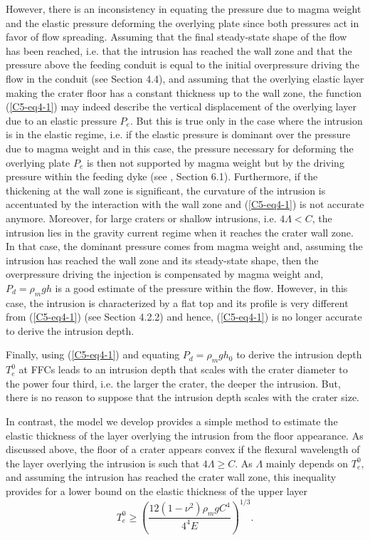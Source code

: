 However, there  is an  inconsistency in equating  the pressure  due to
magma weight  and the elastic  pressure deforming the  overlying plate
since both pressures act in favor of flow spreading. Assuming that the
final steady-state shape  of the flow has been reached,  i.e. that the
intrusion has  reached the wall zone  and that the pressure  above the
feeding conduit is equal to  the initial overpressure driving the flow
in  the conduit  (see Section  4.4), and  assuming that  the overlying
elastic layer making  the crater floor has a constant  thickness up to
the wall zone,  the function (\ref{C5-eq4-1}) may  indeed describe the
vertical  displacement  of  the  overlying layer  due  to  an  elastic
pressure  $P_{e}$.  But  this  is  true only  in  the  case where  the
intrusion is  in the elastic regime,  i.e. if the elastic  pressure is
dominant over the  pressure due to magma weight and  in this case, the
pressure necessary for  deforming the overlying plate  $P_{e}$ is then
not supported by  magma weight but by the driving  pressure within the
feeding dyke (see  \citep{Michaut:2011kg}, Section 6.1).  Furthermore,
if the  thickening at the wall  zone is significant, the  curvature of
the intrusion is accentuated by the interaction with the wall zone and
(\ref{C5-eq4-1}) is not accurate anymore.  Moreover, for large craters
or shallow intrusions, i.e.  $4\Lambda  <C$, the intrusion lies in the
gravity current regime  when it reaches the crater wall  zone. In that
case, the dominant pressure comes  from magma weight and, assuming the
intrusion has reached  the wall zone and its  steady-state shape, then
the overpressure driving the injection  is compensated by magma weight
and, $P_{d}=\rho_{m}gh$ is a good  estimate of the pressure within the
flow. However, in  this case, the intrusion is characterized  by a flat
top  and its  profile  is very  different  from (\ref{C5-eq4-1})  (see
Section   4.2.2)   \citep{Bunger:2011cb,Michaut:2011kg}   and   hence,
(\ref{C5-eq4-1}) is no longer accurate to derive the intrusion depth.
		
Finally,  using (\ref{C5-eq4-1})  and equating  $P_d=\rho_m g  h_0$ to
derive the intrusion depth $T_e^0$ at FFCs leads to an intrusion depth
that scales with the crater diameter to the power four third, i.e. the
larger the crater, the deeper the  intrusion.  But, there is no reason
to suppose that the intrusion depth scales with the crater size.
		
In contrast, the model we develop provides a simple method to estimate
the elastic  thickness of the  layer overlying the intrusion  from the
floor appearance.  As  discussed above, the floor of  a crater appears
convex if the flexural wavelength of the layer overlying the intrusion
is  such that  $4  \Lambda \ge  C$.  As  $\Lambda$  mainly depends  on
$T_{e}^0$,  and assuming  the intrusion  has reached  the crater  wall
zone,  this inequality  provides  for  a lower  bound  on the  elastic
thickness of the upper layer
\begin{equation}
  T_{e}^0 \ge \left(\frac{12(1-\nu^{2})\rho_{m}gC^{4}}{4^4 E}\right)^{1/3}.
  \label{C5-eq5-2}
\end{equation}

